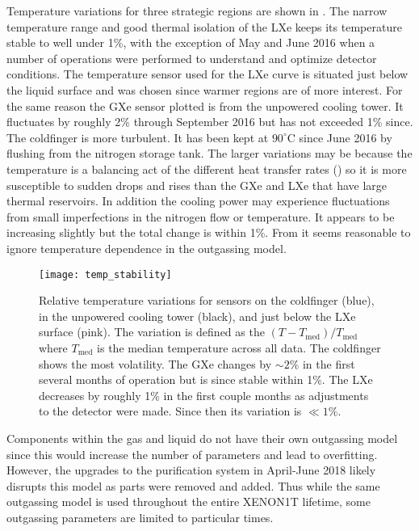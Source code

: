 Temperature variations for three strategic regions are shown in .  The
narrow temperature range and good thermal isolation of the LXe keeps its temperature stable to well under 1\%, with the exception of May
and June 2016 when a number of operations were performed to understand and optimize detector conditions.  The temperature sensor used for
the LXe curve is situated just below the liquid surface and was chosen since warmer regions are of more interest.  For the same reason the
GXe sensor plotted
is from the unpowered cooling tower.  It fluctuates by roughly 2\% through September 2016 but has not exceeded 1\% since.  The 
coldfinger is more turbulent.  It has been kept at $90^{\circ}\mathrm{C}$
since June 2016 by flushing  from the nitrogen storage tank.  The larger variations may be because the temperature is a
balancing act of the
different heat transfer rates () so it is more susceptible to sudden drops and
rises than the GXe and LXe that have large thermal reservoirs.  In addition the cooling power may experience fluctuations from small
imperfections in the nitrogen flow or temperature.  It appears to be increasing slightly but the total change is within
1\%.  From  it seems reasonable to ignore temperature dependence in the outgassing
model.

\begin{figure}
\centering
\texttt{[image: temp\_stability]}
\caption{Relative temperature variations for sensors on the  coldfinger (blue), in the unpowered cooling
tower (black), and just below the LXe surface (pink).  The variation is defined as the $(T - T_{\mathrm{med}}) / T_{\mathrm{med}}$ where
$T_{\mathrm{med}}$ is the median temperature across all data.  The  coldfinger shows the most volatility.  The GXe changes by
${\sim}2\%$ in the first several months of operation but is since stable within 1\%.  The LXe decreases by roughly 1\% in the first couple
months as adjustments to the detector were made.  Since then its variation is $\ll 1\%$.}
\label{fig:electron_lifetime_model_outgassing_temp_stability}
\end{figure}

Components within the gas and liquid do not have their own outgassing model since this would increase the number of
parameters and lead to overfitting.  However, the upgrades to the purification system in April-June 2018 likely disrupts this model
as parts were removed and added.  Thus while the same outgassing model is used throughout the entire XENON1T lifetime, some outgassing
parameters are limited to particular times.

